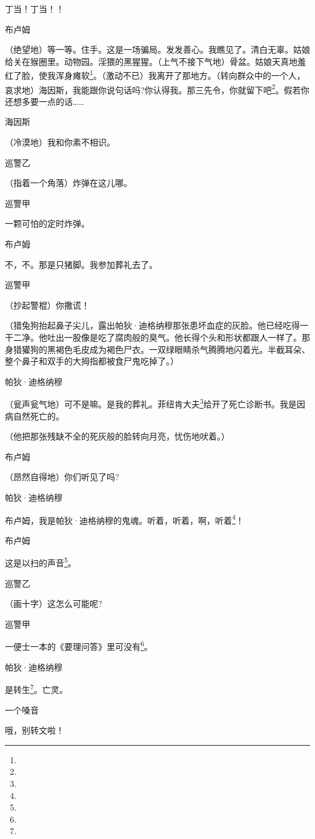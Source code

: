 \par 丁当！丁当！！
\par 布卢姆
\par （绝望地）等一等。住手。这是一场骗局。发发善心。我瞧见了。清白无辜。姑娘给关在猴圈里。动物园。淫猥的黑猩猩。（上气不接下气地）骨盆。姑娘天真地羞红了脸，使我浑身瘫软\footnote{}。（激动不已）我离开了那地方。（转向群众中的一个人，哀求地）海因斯，我能跟你说句话吗?你认得我。那三先令，你就留下吧\footnote{}。假若你还想多要一点的话……
\par 海因斯
\par （冷漠地）我和你素不相识。
\par 巡警乙
\par （指着一个角落）炸弹在这儿哪。
\par 巡警甲
\par 一颗可怕的定时炸弹。
\par 布卢姆
\par 不，不。那是只猪脚。我参加葬礼去了。
\par 巡警甲
\par （抄起警棍）你撒谎！
\par （猎兔狗抬起鼻子尖儿，露出帕狄·迪格纳穆那张患坏血症的灰脸。他已经吃得一干二净。他吐出一股像是吃了腐肉般的臭气。他长得个头和形状都跟人一样了。那身猎獾狗的黑褐色毛皮成为褐色尸衣。一双绿眼睛杀气腾腾地闪着光。半截耳朵、整个鼻子和双手的大拇指都被食尸鬼吃掉了。）
\par 帕狄·迪格纳穆
\par （瓮声瓮气地）可不是嘛。是我的葬礼。菲纽肯大夫\footnote{}给开了死亡诊断书。我是因病自然死亡的。
\par （他把那张残缺不全的死灰般的脸转向月亮，忧伤地吠着。）
\par 布卢姆
\par （昂然自得地）你们听见了吗?
\par 帕狄·迪格纳穆
\par 布卢姆，我是帕狄·迪格纳穆的鬼魂。听着，听着，啊，听着\footnote{}！
\par 布卢姆
\par 这是以扫的声音\footnote{}。
\par 巡警乙
\par （画十字）这怎么可能呢?
\par 巡警甲
\par 一便士一本的《要理问答》里可没有\footnote{}。
\par 帕狄·迪格纳穆
\par 是转生\footnote{}。亡灵。
\par 一个嗓音
\par 哦，别转文啦！
